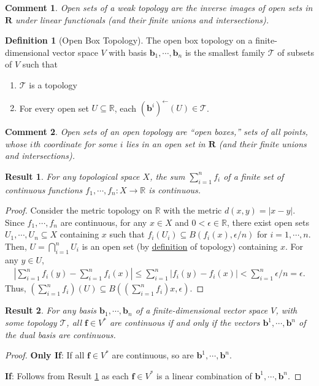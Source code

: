 \documentclass[letterpaper,12pt]{article}
\theoremstyle{plain}
\newtheorem{res}{Result}
\theoremstyle{plain}
\newtheorem*{cmnt*}{Comment}
\theoremstyle{definition}
\newtheorem{defn}{Definition}
\begin{document}
\begin{cmnt*} Open sets of a weak topology are the inverse images of open sets in $\mathbf{R}$ under linear functionals (and their finite unions and intersections).
\end{cmnt*}

\begin{defn}[Open Box Topology]\label{defotop}
The open box topology on a finite-dimensional vector space $V$ with basis $\mathbf{b}_1,\cdots,\mathbf{b}_n$ is the smallest family $\mathcal{T}$ of subsets of $V$ such that
\begin{enumerate}
\item $\mathcal{T}$ is a topology
\item For every open set $U\subseteq \mathbb{R}$, each $(\mathbf{b}^i)^{\leftarrow}(U)\in \mathcal{T}$.
\end{enumerate}
\end{defn}

\begin{cmnt*} Open sets of an open topology are ``open boxes,'' sets of all points, whose $i$th coordinate for some $i$ lies in an open set in $\mathbf{R}$ (and their finite unions and intersections).
\end{cmnt*}

\begin{res}\label{resconsum}
For any topological space $X$, the sum $\sum_{i=1}^n f_i$ of a finite set of continuous functions $f_1,\cdots,f_n:X\rightarrow \mathbb{R}$ is continuous.
\end{res}
\begin{proof}
Consider the metric topology on $\mathbb{R}$ with the metric $d(x,y)=|x-y|$. Since $f_1,\cdots,f_n$ are continuous, for any $x\in X$ and $0<\epsilon\in \mathbb{R}$, there exist open sets $U_1,\cdots,U_n\subseteq X$ containing $x$ such that $f_i(U_i)\subseteq B(f_i(x),\epsilon/n)$ for $i=1,\cdots,n$. Then, $U=\bigcap_{i=1}^n U_i$ is an open set (by \hyperref[deftop]{definition} of topology) containing $x$. For any $y\in U$,
\begin{align*}
\left| \sum_{i=1}^nf_i(y) - \sum_{i=1}^nf_i(x)\right| \le \sum_{i=1}^n\left| f_i(y) - f_i(x)\right| < \sum_{i=1}^n \epsilon/n = \epsilon.
\end{align*}
Thus, $\left(\sum_{i=1}^nf_i\right)(U)\subseteq B\left( \left(\sum_{i=1}^nf_i\right)x, \epsilon\right)$.
\end{proof}

\begin{res}\label{resconb}
For any basis $\mathbf{b}_1,\cdots,\mathbf{b}_n$ of a finite-dimensional vector space $V$, with some topology $\mathcal{T}$, all $\mathbf{f}\in V^*$ are continuous if and only if the vectors $\mathbf{b}^1,\cdots,\mathbf{b}^n$ of the dual basis are continuous.
\end{res}
\begin{proof}
\textbf{Only If}: If all $\mathbf{f}\in V^*$ are continuous, so are $\mathbf{b}^1,\cdots,\mathbf{b}^n$.

\noindent \textbf{If}: Follows from Result \ref{resconsum} as each $\mathbf{f}\in V^*$ is a linear combination of $\mathbf{b}^1,\cdots,\mathbf{b}^n$.
\end{proof}
\end{document}

